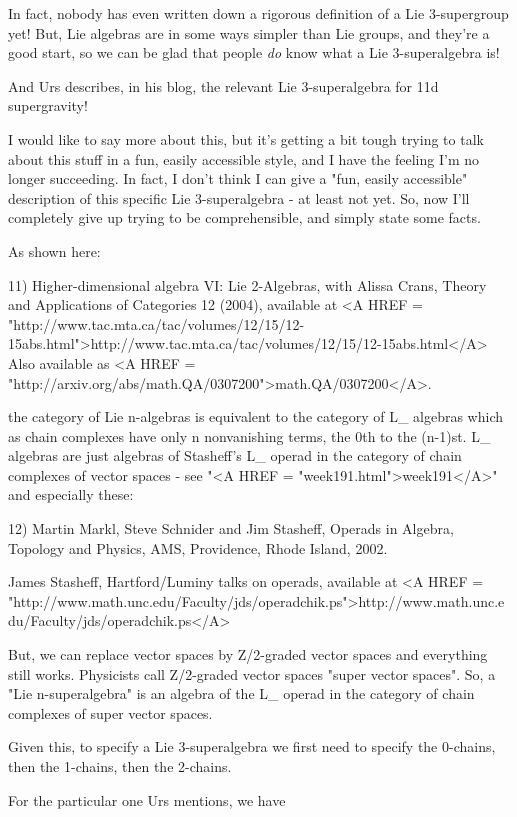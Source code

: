 In fact, nobody has even written down a rigorous definition
of a Lie 3-supergroup yet!  But, Lie algebras are in some ways 
simpler than Lie groups, and they're a good start, so we can
be glad that people \emph{do} know what a Lie 3-superalgebra is!

And Urs describes, in his blog, the relevant Lie 3-superalgebra
for 11d supergravity!

I would like to say more about this, but it's getting a bit 
tough trying to talk about this stuff in a fun, easily accessible 
style, and I have the feeling I'm no longer succeeding.  In fact,
I don't think I can give a "fun, easily accessible" description 
of this specific Lie 3-superalgebra - at least not yet.  So, 
now I'll completely give up trying to be comprehensible, and simply 
state some facts.

As shown here:

11) Higher-dimensional algebra VI: Lie 2-Algebras, with Alissa
Crans, Theory and Applications of Categories 12 (2004),
available at <A HREF = "http://www.tac.mta.ca/tac/volumes/12/15/12-15abs.html">http://www.tac.mta.ca/tac/volumes/12/15/12-15abs.html</A>  
Also available as <A HREF = "http://arxiv.org/abs/math.QA/0307200">math.QA/0307200</A>.

the category of Lie n-algebras is equivalent to the category
of L_{\infty } algebras which as chain complexes have only n
nonvanishing terms, the 0th to the (n-1)st.  L_{\infty } algebras
are just algebras of Stasheff's L_{\infty } operad in the category
of chain complexes of vector spaces - see "<A HREF = "week191.html">week191</A>"
and especially these:

12) Martin Markl, Steve Schnider and Jim Stasheff, Operads in Algebra,
Topology and Physics, AMS, Providence, Rhode Island, 2002.

James Stasheff, Hartford/Luminy talks on operads, available at 
<A HREF = "http://www.math.unc.edu/Faculty/jds/operadchik.ps">http://www.math.unc.edu/Faculty/jds/operadchik.ps</A>

But, we can replace vector spaces by Z/2-graded vector spaces and
everything still works.  Physicists call Z/2-graded vector spaces
"super vector spaces".  So, a "Lie n-superalgebra"
is an algebra of the L_{\infty } operad in the category of
chain complexes of super vector spaces.

Given this, to specify a Lie 3-superalgebra we first need to
specify the 0-chains, then the 1-chains, then the 2-chains.  

For the particular one Urs mentions, we have


